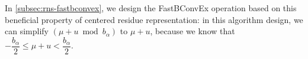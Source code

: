 In \autoref{subsec:rns-fastbconvex}, we design the \textsf{FastBConvEx} operation based on this beneficial property of centered residue representation: in this algorithm design, we can simplify $(\mu + u \bmod b_\alpha)$ to $\mu + u$, because we know that $-\dfrac{b_\alpha}{2} \leq \mu + u < \dfrac{b_\alpha}{2}$.
